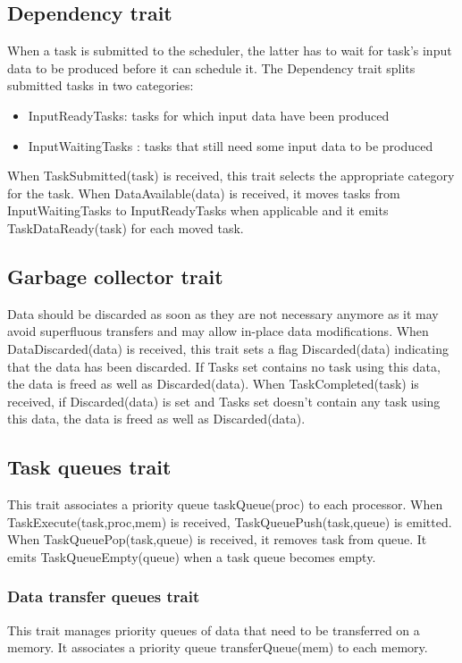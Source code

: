 \subsection{Dependency trait}
When a task is submitted to the scheduler, the latter has to wait for task's input data to be produced before it can schedule it.
The Dependency trait splits submitted tasks in two categories:
\begin{itemize}
  \item InputReadyTasks: tasks for which input data have been produced
  \item InputWaitingTasks : tasks that still need some input data to be produced
\end{itemize}

When TaskSubmitted(task) is received, this trait selects the appropriate category for the task.
When DataAvailable(data) is received, it moves tasks from InputWaitingTasks to InputReadyTasks when applicable and it emits TaskDataReady(task) for each moved task.

\subsection{Garbage collector trait}
Data should be discarded as soon as they are not necessary anymore as it may avoid superfluous transfers and may allow in-place data modifications.
When DataDiscarded(data) is received, this trait sets a flag Discarded(data) indicating that the data has been discarded.
If Tasks set contains no task using this data, the data is freed as well as Discarded(data).
When TaskCompleted(task) is received, if Discarded(data) is set and Tasks set doesn't contain any task using this data, the data is freed as well as Discarded(data).


\subsection{Task queues trait}
This trait associates a priority queue taskQueue(proc) to each processor.
When TaskExecute(task,proc,mem) is received, TaskQueuePush(task,queue) is emitted.
When TaskQueuePop(task,queue) is received, it removes task from queue.
It emits TaskQueueEmpty(queue) when a task queue becomes empty.

\subsubsection{Data transfer queues trait}
This trait manages priority queues of data that need to be transferred on a memory.
It associates a priority queue transferQueue(mem) to each memory.

